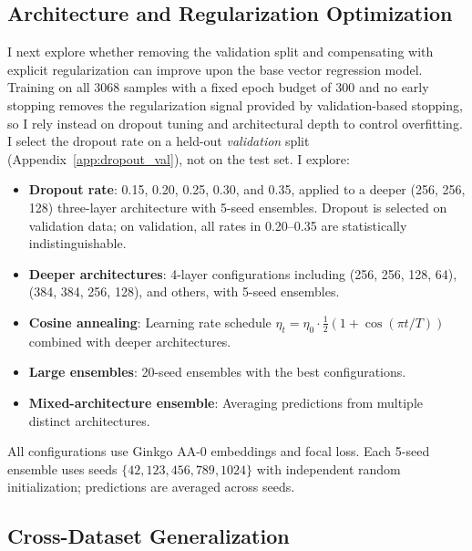 \documentclass[12pt]{article}
\begin{document}
\subsection{Architecture and Regularization Optimization}
\label{sec:arch_opt_methods}
I next explore whether removing the validation split and compensating with explicit regularization can improve upon the base vector regression model.
Training on all 3068 samples with a fixed epoch budget of 300 and no early stopping removes the regularization signal provided by validation-based stopping, so I rely instead on dropout tuning and architectural depth to control overfitting.
I select the dropout rate on a held-out \emph{validation} split (Appendix~\ref{app:dropout_val}), not on the test set.
I explore:
\begin{itemize}
    \item \textbf{Dropout rate}: 0.15, 0.20, 0.25, 0.30, and 0.35, applied to a deeper (256, 256, 128) three-layer architecture with 5-seed ensembles. Dropout is selected on validation data; on validation, all rates in 0.20--0.35 are statistically indistinguishable.
    \item \textbf{Deeper architectures}: 4-layer configurations including (256, 256, 128, 64), (384, 384, 256, 128), and others, with 5-seed ensembles.
    \item \textbf{Cosine annealing}: Learning rate schedule $\eta_t = \eta_0 \cdot \frac{1}{2}(1 + \cos(\pi t / T))$ combined with deeper architectures.
    \item \textbf{Large ensembles}: 20-seed ensembles with the best configurations.
    \item \textbf{Mixed-architecture ensemble}: Averaging predictions from multiple distinct architectures.
\end{itemize}
All configurations use Ginkgo AA-0 embeddings and focal loss.
Each 5-seed ensemble uses seeds $\{42, 123, 456, 789, 1024\}$ with independent random initialization; predictions are averaged across seeds.

\subsection{Cross-Dataset Generalization}
\label{sec:cross_dataset_methods}
\end{document}
